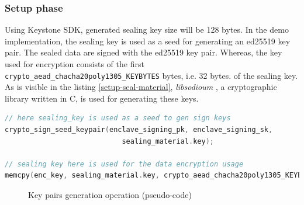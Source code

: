 \subsubsection{Setup phase}
Using Keystone SDK, generated sealing key size will be 128 bytes. In the demo implementation, the sealing key is used as a seed for generating an ed25519 key pair. The sealed data are signed with the ed25519 key pair. Whereas, the key used for encryption consists of the first \texttt{crypto\_aead\_chacha20poly1305\_KEYBYTES} bytes, i.e. 32 bytes. of the sealing key. As is visible in the listing \ref{setup-seal-material}, \textit{libsodioum} \cite{libsodium}, a cryptographic library written in C, is used for generating these keys. \\

\begin{lstlisting}[caption={Setup of the encryption key and ed25519 keypair},captionpos=b,label={setup-seal-material},language=C,frame=single]
// here sealing_key is used as a seed to gen sign keys
crypto_sign_seed_keypair(enclave_signing_pk, enclave_signing_sk,
                            sealing_material.key);

// sealing key here is used for the data encryption usage
memcpy(enc_key, sealing_material.key, crypto_aead_chacha20poly1305_KEYBYTES); 
\end{lstlisting}

\begin{figure}[!h]
    \centering
    
    \caption{Key pairs generation operation (pseudo-code)}
    \label{poc-gen-keys}
\end{figure}


